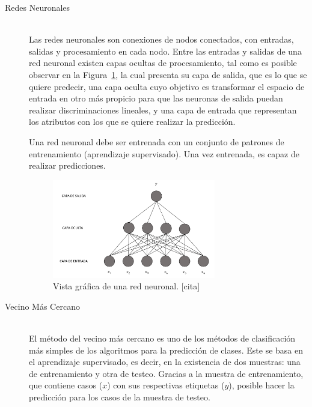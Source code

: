 \begin{enumerate}
\begin{description}
      \item[Redes Neuronales] \hfill \\
      Las redes neuronales son conexiones de nodos conectados, con entradas,  salidas y procesamiento en cada nodo. Entre las entradas y salidas de una red neuronal existen capas ocultas de procesamiento, tal como es posible observar en la Figura~\ref{fig:redneuronal}, la cual presenta su capa de salida, que es lo que se quiere predecir, una capa oculta cuyo objetivo es transformar el espacio de entrada en otro más propicio para que las neuronas de salida puedan realizar discriminaciones lineales, y una capa de entrada que representan los atributos con los que se quiere realizar la predicción. 
      
      Una red neuronal debe ser entrenada con un conjunto de patrones de entrenamiento (aprendizaje supervisado). Una vez entrenada, es capaz de realizar predicciones. 
      
       \begin{figure}[H]
        \centering
        \includegraphics[width=0.7\textwidth]{Figuras/RedNeuronal}
         \caption{Vista gráfica de una red neuronal.  [cita]}
         \label{fig:redneuronal}
      \end{figure}

      \item[Vecino Más Cercano] \hfill \\
     El método del vecino más cercano es uno de los métodos de clasificación más simples de los algoritmos para la predicción de clases. Este se basa en el aprendizaje supervisado, es decir, en la existencia de dos muestras: una de entrenamiento y otra de testeo. Gracias a la muestra de entrenamiento, que contiene casos ($x$) con sus respectivas etiquetas ($y$), posible hacer la predicción para los casos de la muestra de testeo.
     

\end{description}
\end{enumerate}
